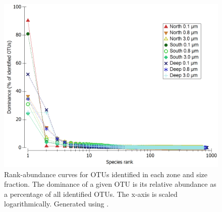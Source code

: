 \begin{figure}
  \centering
  \includegraphics[width=\textwidth]{../polarfront/rankabundance.png}
  \caption[Rank-abundance curves for OTUs in each zone and size fraction]{Rank-abundance curves for OTUs identified in each zone and size fraction. The dominance of a given OTU is its relative abundance as a percentage of all identified OTUs. The x-axis is scaled logarithmically. Generated using .}
  \label{fig:rankabundance}
\end{figure}
